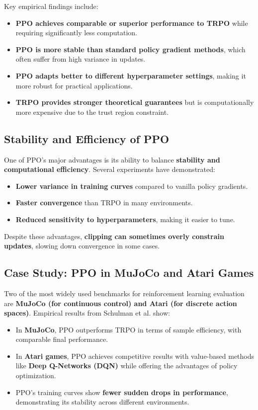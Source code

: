 \documentclass[12pt]{extreport} %
\begin{document}
Key empirical findings include:

\begin{itemize}
    \item \textbf{PPO achieves comparable or superior performance to TRPO} while requiring significantly less computation.
    \item \textbf{PPO is more stable than standard policy gradient methods}, which often suffer from high variance in updates.
    \item \textbf{PPO adapts better to different hyperparameter settings}, making it more robust for practical applications.
    \item \textbf{TRPO provides stronger theoretical guarantees} but is computationally more expensive due to the trust region constraint.
\end{itemize}

\subsection{\textbf{Stability and Efficiency of PPO}}

One of PPO's major advantages is its ability to balance \textbf{stability and computational efficiency}. Several experiments have demonstrated:

\begin{itemize}
    \item \textbf{Lower variance in training curves} compared to vanilla policy gradients.
    \item \textbf{Faster convergence} than TRPO in many environments.
    \item \textbf{Reduced sensitivity to hyperparameters}, making it easier to tune.
\end{itemize}

Despite these advantages, \textbf{clipping can sometimes overly constrain updates}, slowing down convergence in some cases.

\subsection{\textbf{Case Study: PPO in MuJoCo and Atari Games}}

Two of the most widely used benchmarks for reinforcement learning evaluation are \textbf{MuJoCo (for continuous control) and Atari (for discrete action spaces)}. Empirical results from Schulman et al. \cite{schulman2017proximal} show:

\begin{itemize}
    \item In \textbf{MuJoCo}, PPO outperforms TRPO in terms of sample efficiency, with comparable final performance.
    \item In \textbf{Atari games}, PPO achieves competitive results with value-based methods like \textbf{Deep Q-Networks (DQN)} while offering the advantages of policy optimization.
    \item PPO's training curves show \textbf{fewer sudden drops in performance}, demonstrating its stability across different environments.
\end{itemize}
\end{document}
